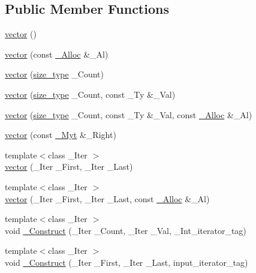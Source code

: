 \subsection*{Public Member Functions}
\begin{DoxyCompactItemize}
\item 
\hyperlink{classvector_a228c9f7f14ec03dc6c77b58ad336aef3}{vector} ()
\item 
\hyperlink{classvector_ab21a4ccb639ea9fd983deaf97ae08034}{vector} (const \hyperlink{classvector_af95a9863612fdd67572c39c825c5aee6}{\+\_\+\+Alloc} \&\+\_\+\+Al)
\item 
\hyperlink{classvector_a51699cf57fc396ee5e6d220cc443e1b9}{vector} (\hyperlink{classvector_ac975e84f5d6c2fe2267bb354a85818af}{size\+\_\+type} \+\_\+\+Count)
\item 
\hyperlink{classvector_a216cecdf1dce89b22e429f462f782c05}{vector} (\hyperlink{classvector_ac975e84f5d6c2fe2267bb354a85818af}{size\+\_\+type} \+\_\+\+Count, const \+\_\+\+Ty \&\+\_\+\+Val)
\item 
\hyperlink{classvector_aa42d2e860dd28f204fb63ff24c8d046d}{vector} (\hyperlink{classvector_ac975e84f5d6c2fe2267bb354a85818af}{size\+\_\+type} \+\_\+\+Count, const \+\_\+\+Ty \&\+\_\+\+Val, const \hyperlink{classvector_af95a9863612fdd67572c39c825c5aee6}{\+\_\+\+Alloc} \&\+\_\+\+Al)
\item 
\hyperlink{classvector_ad33fdaff980e232bc58ae3ffcc39b44a}{vector} (const \hyperlink{classvector_ae499c665535254a7364e3a219b780112}{\+\_\+\+Myt} \&\+\_\+\+Right)
\item 
{\footnotesize template$<$class \+\_\+\+Iter $>$ }\\\hyperlink{classvector_a91c17323d484d96fd650414a1b4355e5}{vector} (\+\_\+\+Iter \+\_\+\+First, \+\_\+\+Iter \+\_\+\+Last)
\item 
{\footnotesize template$<$class \+\_\+\+Iter $>$ }\\\hyperlink{classvector_a49286302a69b1ea41854e75183810cba}{vector} (\+\_\+\+Iter \+\_\+\+First, \+\_\+\+Iter \+\_\+\+Last, const \hyperlink{classvector_af95a9863612fdd67572c39c825c5aee6}{\+\_\+\+Alloc} \&\+\_\+\+Al)
\item 
{\footnotesize template$<$class \+\_\+\+Iter $>$ }\\void \hyperlink{classvector_af458407343307d48e496bad8e3aaecbf}{\+\_\+\+Construct} (\+\_\+\+Iter \+\_\+\+Count, \+\_\+\+Iter \+\_\+\+Val, \+\_\+\+Int\+\_\+iterator\+\_\+tag)
\item 
{\footnotesize template$<$class \+\_\+\+Iter $>$ }\\void \hyperlink{classvector_a8d6b5f89ce28d9e71f67500a96cefa45}{\+\_\+\+Construct} (\+\_\+\+Iter \+\_\+\+First, \+\_\+\+Iter \+\_\+\+Last, input\+\_\+iterator\+\_\+tag)

\end{DoxyCompactItemize}
